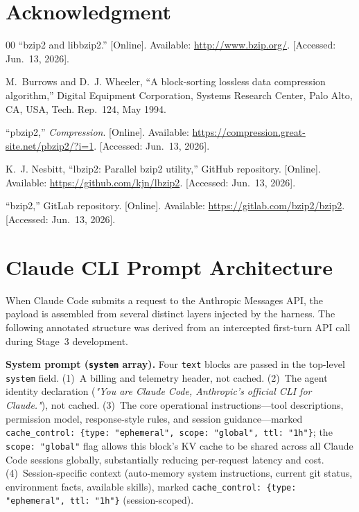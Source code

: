 \documentclass[conference]{IEEEtran}
\newcommand{\mainbodyendpage}{?}
\begin{document}
\section*{Acknowledgment}

\begin{thebibliography}{00}
``bzip2 and libbzip2.'' [Online]. Available: \url{http://www.bzip.org/}. [Accessed: Jun.~13, 2026].

M.~Burrows and D.~J. Wheeler, ``A block-sorting lossless data compression algorithm,'' Digital Equipment Corporation, Systems Research Center, Palo Alto, CA, USA, Tech. Rep.~124, May 1994.

``pbzip2,'' \emph{Compression}. [Online]. Available: \url{https://compression.great-site.net/pbzip2/?i=1}. [Accessed: Jun.~13, 2026].

K.~J. Nesbitt, ``lbzip2: Parallel bzip2 utility,'' GitHub repository. [Online]. Available: \url{https://github.com/kjn/lbzip2}. [Accessed: Jun.~13, 2026].

``bzip2,'' GitLab repository. [Online]. Available: \url{https://gitlab.com/bzip2/bzip2}. [Accessed: Jun.~13, 2026].
\end{thebibliography}

\xdef\mainbodyendpage{\thepage}

\appendices

\section{Claude CLI Prompt Architecture}
\label{app:prompt-arch}

When Claude Code submits a request to the Anthropic Messages API, the payload
is assembled from several distinct layers injected by the harness.
The following annotated structure was derived from an intercepted first-turn
API call during Stage~3 development.

\textbf{System prompt (\texttt{system} array).}
Four \texttt{text} blocks are passed in the top-level \texttt{system} field.
(1)~A billing and telemetry header, not cached.
(2)~The agent identity declaration (\textit{"You are Claude Code, Anthropic's
official CLI for Claude."}), not cached.
(3)~The core operational instructions---tool descriptions, permission model,
response-style rules, and session guidance---marked
\texttt{cache\_control: \{type: "ephemeral", scope: "global", ttl: "1h"\}};
the \texttt{scope: "global"} flag allows this block's KV cache to be shared
across all Claude Code sessions globally, substantially reducing per-request
latency and cost.
(4)~Session-specific context (auto-memory system instructions, current git
status, environment facts, available skills), marked
\texttt{cache\_control: \{type: "ephemeral", ttl: "1h"\}} (session-scoped).
\end{document}
